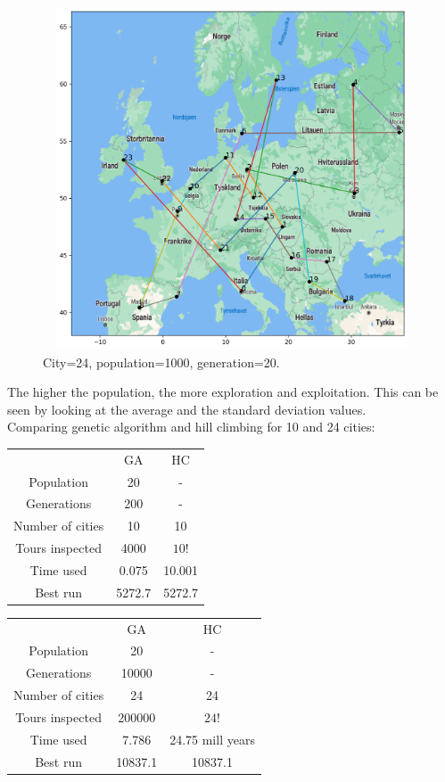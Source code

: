 \documentclass[a4paper,12pt]{article}
\begin{document}
\begin{figure}[H]
\centerline{\includegraphics[width=6in, height=4in]{geneticMap6.png}}
\caption{City=24, population=1000, generation=20.}
\label{fig}
\end{figure}
The higher the population, the more exploration and exploitation. This can be seen by looking at the average and the standard deviation values. \\ 

Comparing genetic algorithm and hill climbing for 10 and 24 cities:
\begin{center}
\begin{tabular}{ c c c}
 & GA & HC  \\ 
 Population & 20 & - \\ 
Generations & 200 & - \\ 
 Number of cities & 10 &10  \\  
Tours inspected & 4000 & $10!$ \\
 Time used & 0.075 &  10.001 \\  
 Best run & 5272.7 & 5272.7 \\ 
\end{tabular}
\end{center}

\begin{center}
\begin{tabular}{ c c c}
 & GA & HC  \\ 
 Population & 20 & - \\ 
Generations & 10000 & - \\ 
 Number of cities & 24 & 24 \\  
Tours inspected & 200000 & $24!$ \\
 Time used & 7.786 &  24.75 mill years \\  
 Best run & 10837.1 & 10837.1 \\ 
\end{tabular}
\end{center}
\end{document}
